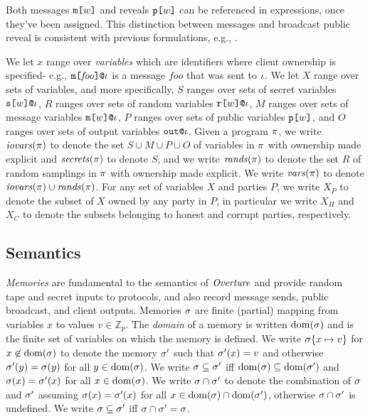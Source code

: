 Both messages $\texttt{m[}w\texttt{]}$ and reveals $\texttt{p[}w\texttt{]}$ can be
referenced in expressions, once they've been assigned.
This distinction between messages and broadcast public
reveal is consistent with previous formulations, e.g.,
\cite{6266151}.

We let $x$ range over \emph{variables} which are identifiers where
client ownership is specified- e.g.,
$\texttt{m[}\mathit{foo}\texttt{]}\texttt{@}\iota$ is a message $\mathit{foo}$ that
was sent to $\iota$. We let $X$ range over sets of variables, and more
specifically, $S$ ranges over sets of secret variables
$\texttt{s[}w\texttt{]}\texttt{@}\iota$, $R$ ranges over sets of random variables
$\texttt{r[}w\texttt{]}\texttt{@}\iota$, $M$ ranges over sets of message variables
$\texttt{m[}w\texttt{]}\texttt{@}\iota$, $P$ ranges over sets of public variables
$\texttt{p[}w\texttt{]}$, and $O$ ranges over sets of output variables $\texttt{out}\texttt{@}\iota$.
Given a program $\pi$, we write $\mathit{iovars}(\pi)$ to denote the set $S
\cup M \cup P \cup O$ of variables in $\pi$ with ownership made
explicit and $\mathit{secrets}(\pi)$ to denote $S$, and we write
$\mathit{rands}(\pi)$ to denote the set $R$ of random samplings in $\pi$
with ownership made explicit. We write $\mathit{vars}(\pi)$ to denote
$\mathit{iovars}(\pi) \cup \mathit{rands}(\pi)$. For any set of variables $X$ and
parties $P$, we write $X_P$ to denote the subset of $X$ owned by any
party in $P$, in particular we write $X_H$ and $X_C$ to denote the
subsets belonging to honest and corrupt parties, respectively.

\subsection{Semantics}

\emph{Memories} are fundamental to the semantics of $\mathit{Overture}$ and
provide random tape and secret inputs to protocols, and also record
message sends, public broadcast, and client outputs. Memories $\sigma$ are finite
(partial) mapping from variables $x$ to values $v \in \mathbb{Z}_p$. The \emph{domain} of a
memory is written $\mathrm{dom}(\sigma)$ and is the finite set of variables on
which the memory is defined. We write $\sigma\{ x \mapsto v\}$ for
$x\not\in\mathrm{dom}(\sigma)$ to denote the memory $\sigma'$ such that
$\sigma'(x) = v$ and otherwise $\sigma'(y) = \sigma(y)$ for all $y
\in \mathrm{dom}(\sigma)$. We write $\sigma \subseteq \sigma'$ iff
$\mathrm{dom}(\sigma) \subseteq \mathrm{dom}(\sigma')$ and $\sigma(x) =
\sigma'(x)$ for all $x \in \mathrm{dom}(\sigma)$. We write $\sigma \cap
\sigma'$ to denote the combination of $\sigma$ and $\sigma'$
assuming $\sigma(x) = \sigma'(x)$ for all $x \in \mathrm{dom}(\sigma)
\cap \mathrm{dom}(\sigma')$, otherwise $\sigma \cap \sigma'$ is undefined.
We write $\sigma \subseteq \sigma'$ iff $\sigma \cap \sigma'
= \sigma$.

